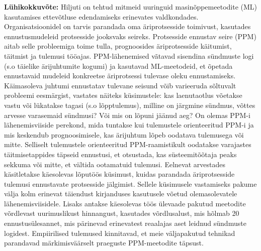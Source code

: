 \begin{abstracts}
{\Large \bfseries L\"{u}hikokkuv\~{o}te:}
Hiljuti on tehtud mitmeid uuringuid masin\~{o}ppemeetodite (ML) kasutamises ettev\~{o}tluse edendamiseks erinevates valdkondades. Organisatsioonidel on tarvis parandada oma \"{a}riprotsesside toimivust, kasutades ennustusmudeleid protsesside jooksvaks seireks. Protsesside ennustav seire (PPM) aitab selle probleemiga toime tulla, prognoosides \"{a}riprotsesside k\"{a}itumist, t\"{a}itmist ja tulemusi t\"{o}\"{o}ajas. PPM-l\"{a}henemised v\~{a}tavad sisendina s\"{u}ndmuste logi (s.o t\"{a}ielike  \"{a}rijuhtumite kogumi) ja kasutavad ML-meetodeid, et \~{o}petada ennustavaid mudeleid konkreetse \"{a}riprotsessi tulevase oleku ennustamiseks. K\"{a}imasoleva juhtumi ennustatav tulevane seisund v\~{o}ib varieeruda s\~{o}ltuvalt probleemi eesm\"{a}rgist, vastates n\"{a}iteks k\"{u}simustele: kas laenutaotlus v\~{o}etakse vastu v\~{o}i l\"{u}katakse tagasi (s.o l\~{o}pptulemus), milline on  j\"{a}rgmine s\"{u}ndmus, v\~{o}ttes arvesse varasemaid s\"{u}ndmusi? V\~{o}i mis on l\~{o}puni j\"{a}\"{a}nud aeg? On olemas PPM-i l\"{a}henemisviiside perekond, mida tuntakse kui tulemustele orienteeritud PPM-i ja mis keskendub prognoosimisele, kas \"{a}rijuhtum l\~{o}peb oodatava tulemusega v\~{o}i mitte. Selliselt tulemustele orienteeritud PPM-raamistikult oodatakse varajastes t\"{a}itmisetappides t\"{a}pseid ennustusi, et otsustada, kas s\"{u}steemit\~{o}\~{o}taja peaks sekkuma v\~{o}i mitte, et v\"{a}ltida ootamatuid tulemusi. Eelnevat arvestades k\"{a}sitletakse k\"{a}esolevas l\~{o}put\"{o}\"{o}s k\"{u}simust, kuidas parandada \"{a}riprotsesside tulemusi ennustavate protsesside j\"{a}lgimist. Sellele k\"{u}simusele vastamiseks pakume v\"{a}lja kolm erinevat t\"{a}iendust kirjanduses kasutusele v\~{o}etud olemasolevatele l\"{a}henemisviisidele. Lisaks antakse k\"{a}esolevas t\"{o}\"{o}s \"{u}levaade pakutud meetodite v\~{o}rdlevast uurimuslikust hinnangust, kasutades v\~{o}rdlusalust, mis h\~{o}lmab 20 ennustusülesannet, mis p\"{a}rinevad erinevatest reaalajas aset leidnud s\"{u}ndmuste logidest. Empiirilised tulemused kinnitavad, et meie v\"{a}ljapakutud tehnikad parandavad m\"{a}rkimisväärselt praeguste PPM-meetodite t\"{a}psust.
\\



\end{abstracts}

